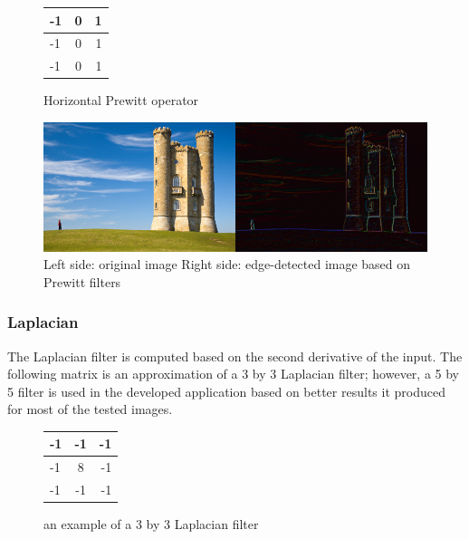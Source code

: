 \documentclass{article}
\begin{document}
\begin{figure}[H]
\begin{center}
 \begin{tabular}{ | l | c | r | }
    \hline
    -1 & 0 & 1 \\ \hline
    -1 & 0 & 1 \\ \hline
    -1 & 0 & 1 \\
    \hline
  \end{tabular}
\end{center}
\caption{Horizontal Prewitt operator\label{pre}}\end{figure}
	\begin{figure} [H]
		\centering
		\includegraphics[scale=0.4]{images/edged}
		\caption{Left side: original image Right side: edge-detected image based on Prewitt filters \label{edge}}
	\end{figure}

		
		\subsubsection{Laplacian}
			The Laplacian filter is computed based on the second derivative of the input. The following matrix is an approximation of a 3 by 3 Laplacian filter; however, a 5 by 5 filter is used in the developed application based on better results it produced for
most of the tested images.

\begin{figure}[H]
	\begin{center}
  \begin{tabular}{ | l | c | r | }
    \hline
    -1 & -1 & -1 \\ \hline
    -1 & 8 & -1 \\ \hline
    -1 & -1 & -1 \\
    \hline
  \end{tabular}
\end{center}
\caption{an example of a 3 by 3 Laplacian filter}\end{figure}
\end{document}
